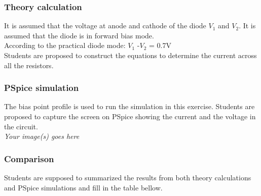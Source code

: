 \subsubsection{Theory calculation}
It is assumed that the voltage at anode and cathode of the diode $V_1$ and $V_2$. It is assumed that the diode is in forward bias mode.\\

According to the practical diode mode: $V_1$ -$V_2$ = 0.7V\\

Students are proposed to construct the equations to determine the current across all the resistors.

\dotfill\bigskip\par\mbox{}\dotfill
\dotfill\bigskip\par\mbox{}\dotfill
\dotfill\bigskip\par\mbox{}\dotfill
\dotfill\bigskip\par\mbox{}\dotfill
\subsubsection{PSpice simulation}
The bias point profile is used to run the simulation in this exercise. Students are proposed to capture the screen on PSpice showing the current and the voltage in the circuit.\\

\textit{Your image(s) goes here}\\
\newpage
\subsubsection{Comparison}
Students are supposed to summarized the results from both theory calculations and PSpice simulations and fill in the table bellow.\\

